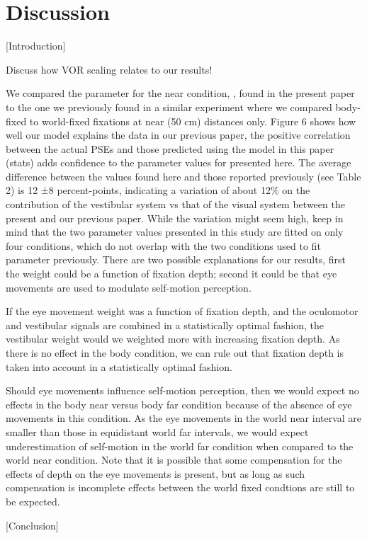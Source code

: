 \section{Discussion}

[Introduction]

Discuss how VOR scaling relates to our results!

We compared the parameter for the near condition, , found in the present paper to the one we previously found in a similar experiment where we compared body-fixed to world-fixed fixations at near (50 cm) distances only. Figure 6 shows how well our model explains the data in our previous paper, the positive correlation between the actual PSEs and those predicted using the model in this paper (stats) adds confidence to the parameter values for  presented here. The average difference between the values found here and those reported previously (see Table 2) is 12 ±8 percent-points, indicating a variation of about 12\% on the contribution of the vestibular system vs that of the visual system between the present and our previous paper. While the variation might seem high, keep in mind that the two parameter values presented in this study are fitted on only four conditions, which do not overlap with the two conditions used to fit  parameter  previously.
There are two possible explanations for our results, first the weight could be a function of fixation depth; second it could be that eye movements are used to modulate self-motion perception.

If the eye movement weight was a function of fixation depth, and the oculomotor and vestibular signals are combined in a statistically optimal fashion, the vestibular weight would we weighted more with increasing fixation depth. As there is no effect in the body condition, we can rule out that fixation depth is taken into account in a statistically optimal fashion.

Should eye movements influence self-motion perception, then we would expect no effects in the body near versus body far condition because of the absence of eye movements in this condition. As the eye movements in the world near interval are smaller than those in equidistant world far intervals, we would expect underestimation of self-motion in the world far condition when compared to the world near condition. Note that it is possible that some compensation for the effects of depth on the eye movements is present, but as long as such compensation is incomplete effects between the world fixed condtions are still to be expected.

[Conclusion]